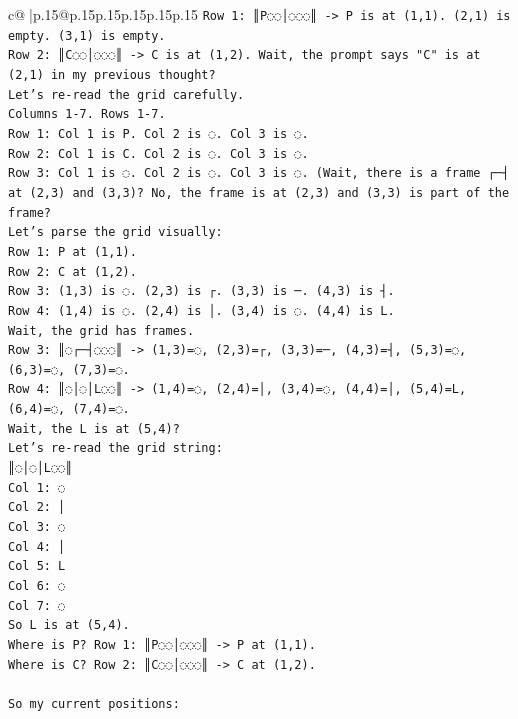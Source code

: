 \documentclass{article}
\begin{document}
{\begin{supertabular}{c@{$\;$}|p{.15\linewidth}@{}p{.15\linewidth}p{.15\linewidth}p{.15\linewidth}p{.15\linewidth}p{.15\linewidth}}
{{{\texttt{Row 1: ║P◌◌│◌◌◌║ {-}> P is at (1,1). (2,1) is empty. (3,1) is empty.} \\
\texttt{Row 2: ║C◌◌│◌◌◌║ {-}> C is at (1,2). Wait, the prompt says "C" is at (2,1) in my previous thought?} \\
\texttt{Let's re{-}read the grid carefully.} \\
\texttt{Columns 1{-}7. Rows 1{-}7.} \\
\texttt{Row 1: Col 1 is P. Col 2 is ◌. Col 3 is ◌.} \\
\texttt{Row 2: Col 1 is C. Col 2 is ◌. Col 3 is ◌.} \\
\texttt{Row 3: Col 1 is ◌. Col 2 is ◌. Col 3 is ◌. (Wait, there is a frame ┌─┤ at (2,3) and (3,3)? No, the frame is at (2,3) and (3,3) is part of the frame?} \\
\texttt{Let's parse the grid visually:} \\
\texttt{Row 1: P at (1,1).} \\
\texttt{Row 2: C at (1,2).} \\
\texttt{Row 3: (1,3) is ◌. (2,3) is ┌. (3,3) is ─. (4,3) is ┤.} \\
\texttt{Row 4: (1,4) is ◌. (2,4) is │. (3,4) is ◌. (4,4) is L.} \\
\texttt{Wait, the grid has frames.} \\
\texttt{Row 3: ║◌┌─┤◌◌◌║ {-}> (1,3)=◌, (2,3)=┌, (3,3)=─, (4,3)=┤, (5,3)=◌, (6,3)=◌, (7,3)=◌.} \\
\texttt{Row 4: ║◌│◌│L◌◌║ {-}> (1,4)=◌, (2,4)=│, (3,4)=◌, (4,4)=│, (5,4)=L, (6,4)=◌, (7,4)=◌.} \\
\texttt{Wait, the L is at (5,4)?} \\
\texttt{Let's re{-}read the grid string:} \\
\texttt{║◌│◌│L◌◌║} \\
\texttt{Col 1: ◌} \\
\texttt{Col 2: │} \\
\texttt{Col 3: ◌} \\
\texttt{Col 4: │} \\
\texttt{Col 5: L} \\
\texttt{Col 6: ◌} \\
\texttt{Col 7: ◌} \\
\texttt{So L is at (5,4).} \\
\texttt{Where is P? Row 1: ║P◌◌│◌◌◌║ {-}> P at (1,1).} \\
\texttt{Where is C? Row 2: ║C◌◌│◌◌◌║ {-}> C at (1,2).} \\
\\ 
\texttt{So my current positions:} \\
}}}
\end{supertabular}}
\end{document}
